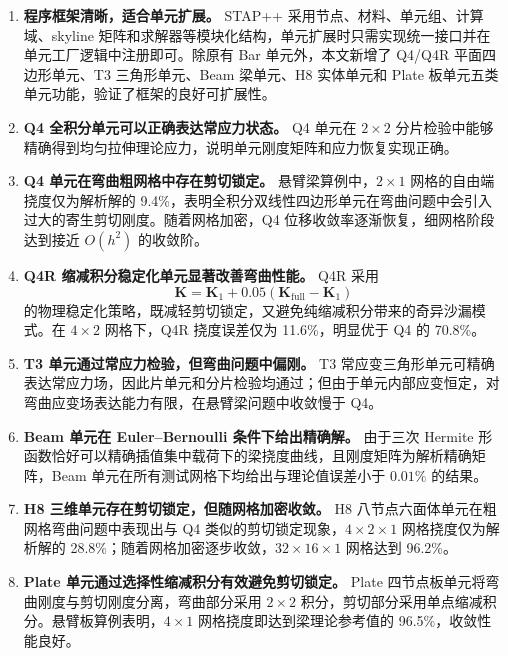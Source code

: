 \documentclass[UTF8,a4paper,zihao=-4]{ctexart}
\newcommand{\Kmat}{\bm{K}}
\begin{document}
\begin{enumerate}
    \item \textbf{程序框架清晰，适合单元扩展。}
    STAP++ 采用节点、材料、单元组、计算域、skyline 矩阵和求解器等模块化结构，单元扩展时只需实现统一接口并在单元工厂逻辑中注册即可。除原有 Bar 单元外，本文新增了 Q4/Q4R 平面四边形单元、T3 三角形单元、Beam 梁单元、H8 实体单元和 Plate 板单元五类单元功能，验证了框架的良好可扩展性。

    \item \textbf{Q4 全积分单元可以正确表达常应力状态。}
    Q4 单元在 $2\times2$ 分片检验中能够精确得到均匀拉伸理论应力，说明单元刚度矩阵和应力恢复实现正确。

    \item \textbf{Q4 单元在弯曲粗网格中存在剪切锁定。}
    悬臂梁算例中，$2\times1$ 网格的自由端挠度仅为解析解的 9.4\%，表明全积分双线性四边形单元在弯曲问题中会引入过大的寄生剪切刚度。随着网格加密，Q4 位移收敛率逐渐恢复，细网格阶段达到接近 $O(h^2)$ 的收敛阶。

    \item \textbf{Q4R 缩减积分稳定化单元显著改善弯曲性能。}
    Q4R 采用
    \[
        \Kmat=\Kmat_1+0.05(\Kmat_{\mathrm{full}}-\Kmat_1)
    \]
    的物理稳定化策略，既减轻剪切锁定，又避免纯缩减积分带来的奇异沙漏模式。在 $4\times2$ 网格下，Q4R 挠度误差仅为 11.6\%，明显优于 Q4 的 70.8\%。

    \item \textbf{T3 单元通过常应力检验，但弯曲问题中偏刚。}
    T3 常应变三角形单元可精确表达常应力场，因此片单元和分片检验均通过；但由于单元内部应变恒定，对弯曲应变场表达能力有限，在悬臂梁问题中收敛慢于 Q4。

    \item \textbf{Beam 单元在 Euler--Bernoulli 条件下给出精确解。}
    由于三次 Hermite 形函数恰好可以精确插值集中载荷下的梁挠度曲线，且刚度矩阵为解析精确矩阵，Beam 单元在所有测试网格下均给出与理论值误差小于 $0.01\%$ 的结果。

    \item \textbf{H8 三维单元存在剪切锁定，但随网格加密收敛。}
    H8 八节点六面体单元在粗网格弯曲问题中表现出与 Q4 类似的剪切锁定现象，$4\times2\times1$ 网格挠度仅为解析解的 28.8\%；随着网格加密逐步收敛，$32\times16\times1$ 网格达到 96.2\%。

    \item \textbf{Plate 单元通过选择性缩减积分有效避免剪切锁定。}
    Plate 四节点板单元将弯曲刚度与剪切刚度分离，弯曲部分采用 $2\times2$ 积分，剪切部分采用单点缩减积分。悬臂板算例表明，$4\times1$ 网格挠度即达到梁理论参考值的 96.5\%，收敛性能良好。


\end{enumerate}
\end{document}
